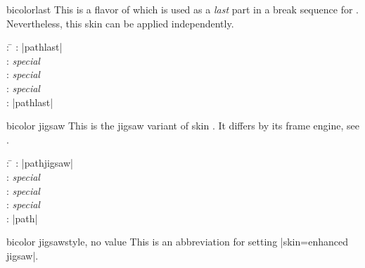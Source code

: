 \clearpage
\begin{docSkin}{bicolorlast}
This is a flavor of  which is used as a \emph{last} part
in a break sequence for .
Nevertheless, this skin can be applied independently.
\begin{tcolorbox}[skintable=bicolorlast]
  \begin{tabbing}
    : \=\kill
    :           \> |pathlast|\\
    : \> \emph{special}\\ 
    :        \> \emph{special}\\
    :    \> \emph{special}\\
    :           \> |pathlast|
  \end{tabbing}
\end{tcolorbox}
\end{docSkin}


\begin{dispExample}
\end{dispExample}


\clearpage

\begin{docSkin}[doc new=2021-05-21]{bicolor jigsaw}
  This is the jigsaw variant of skin .
  It differs by its frame engine, see .
\begin{tcolorbox}[skintable=bicolor jigsaw]
  \begin{tabbing}
    : \=\kill
    :           \> |pathjigsaw|\\
    : \> \emph{special}\\ 
    :        \> \emph{special}\\
    :    \> \emph{special}\\
    :           \> |path|
  \end{tabbing}
\end{tcolorbox}
\end{docSkin}

\begin{docTcbKey}{bicolor jigsaw}{}{style, no value}
  This is an abbreviation for setting |skin=enhanced jigsaw|.
\end{docTcbKey}


